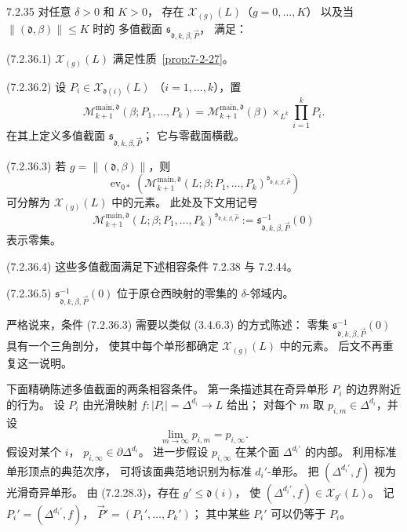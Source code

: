 \begin{proposition}{7.2.35}\label{prop:7-2-35}
对任意 $\delta>0$ 和 $K>0$，
存在 $\mathcal X_{(g)}(L)$（$g=0,\ldots,K$）
以及当 $\|(\mathfrak d,\beta)\|\le K$ 时的
多值截面 $\mathfrak s_{\mathfrak d,k,\beta,\vec P}$，
满足：

\noindent\textup{(7.2.36.1)}\quad
$\mathcal X_{(g)}(L)$ 满足性质~\ref{prop:7-2-27}。

\noindent\textup{(7.2.36.2)}\quad
设 $P_i\in\mathcal X_{\mathfrak d(i)}(L)$
（$i=1,\ldots,k$），置
\[
\mathcal M^{\mathrm{main},\mathfrak d}_{k+1}
(\beta;P_1,\ldots,P_k)
=\mathcal M^{\mathrm{main},\mathfrak d}_{k+1}(\beta)
\mathop{\times}_{L^k}\prod_{i=1}^{k}P_i.
\]
在其上定义多值截面
$\mathfrak s_{\mathfrak d,k,\beta,\vec P}$；
它与零截面横截。

\noindent\textup{(7.2.36.3)}\quad
若 $g=\|(\mathfrak d,\beta)\|$，则
\[
\operatorname{ev}_{0*}
\left(
\mathcal M^{\mathrm{main},\mathfrak d}_{k+1}
(L;\beta;P_1,\ldots,P_k)
^{\mathfrak s_{\mathfrak d,k,\beta,\vec P}}
\right)
\]
可分解为 $\mathcal X_{(g)}(L)$ 中的元素。
此处及下文用记号
\[
\mathcal M^{\mathrm{main},\mathfrak d}_{k+1}
(L;\beta;P_1,\ldots,P_k)
^{\mathfrak s_{\mathfrak d,k,\beta,\vec P}}
:=\mathfrak s_{\mathfrak d,k,\beta,\vec P}^{-1}(0)
\]
表示零集。

\noindent\textup{(7.2.36.4)}\quad
这些多值截面满足下述相容条件
7.2.38 与 7.2.44。

\noindent\textup{(7.2.36.5)}\quad
$\mathfrak s_{\mathfrak d,k,\beta,\vec P}^{-1}(0)$
位于原仓西映射的零集的 $\delta$-邻域内。
\end{proposition}

严格说来，条件 (7.2.36.3)
需要以类似 (3.4.6.3) 的方式陈述：
零集 $\mathfrak s_{\mathfrak d,k,\beta,\vec P}^{-1}(0)$
具有一个三角剖分，
使其中每个单形都确定
$\mathcal X_{(g)}(L)$ 中的元素。
后文不再重复这一说明。

下面精确陈述多值截面的两条相容条件。
第一条描述其在奇异单形 $P_i$ 的边界附近的行为。
设 $P_i$ 由光滑映射
$f\colon|P_i|=\Delta^{d_i}\to L$ 给出；
对每个 $m$ 取 $p_{i,m}\in\Delta^{d_i}$，并设
\begin{equation}
\lim_{m\to\infty}p_{i,m}=p_{i,\infty}.
\tag{7.2.37}\label{eq:7-2-37}
\end{equation}
假设对某个 $i$，
$p_{i,\infty}\in\partial\Delta^{d_i}$。
进一步假设 $p_{i,\infty}$
在某个面 $\Delta^{d_i'}$ 的内部。
利用标准单形顶点的典范次序，
可将该面典范地识别为标准 $d_i'$-单形。
把 $(\Delta^{d_i'},f)$ 视为光滑奇异单形。
由 (7.2.28.3)，存在 $g'\le\mathfrak d(i)$，
使 $(\Delta^{d_i'},f)\in\mathcal X_{g'}(L)$。
记 $P_i'=(\Delta^{d_i'},f)$，
$\vec P'=(P_1',\ldots,P_k')$；
其中某些 $P_i'$ 可以仍等于 $P_i$。

